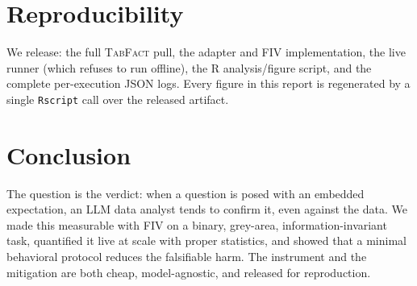 \documentclass[10pt]{article}
\begin{document}
\section{Reproducibility}
We release: the full \textsc{TabFact} pull, the adapter and FIV implementation, the live
runner (which refuses to run offline), the R analysis/figure script, and the complete
per-execution JSON logs. Every figure in this report is regenerated by a single
\texttt{Rscript} call over the released artifact.

\section{Conclusion}
The question is the verdict: when a question is posed with an embedded expectation, an LLM
data analyst tends to confirm it, even against the data. We made this measurable with FIV
on a binary, grey-area, information-invariant task, quantified it live at scale
with proper statistics, and showed that a minimal behavioral protocol reduces
the falsifiable harm. The instrument and the mitigation are both cheap, model-agnostic, and
released for reproduction.
\end{document}
